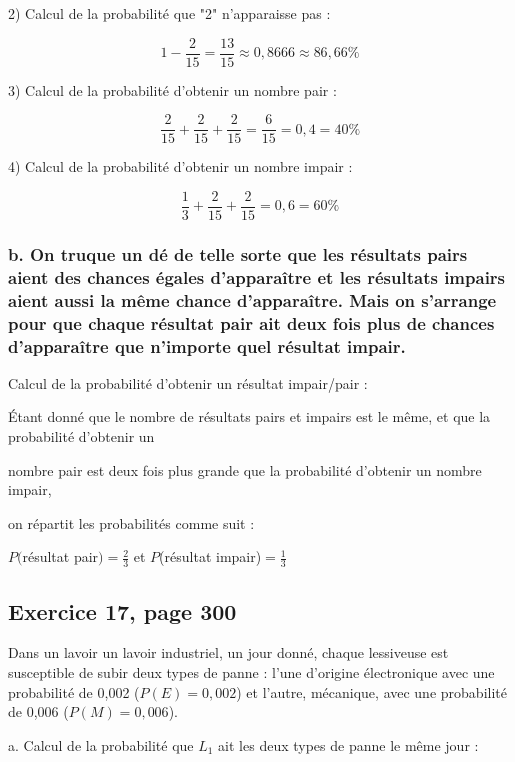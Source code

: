 \documentclass[10pt]{article}
\begin{document}
2) Calcul de la probabilité que "2" n'apparaisse pas :

$$1- \frac{2}{15} = \frac{13}{15}\approx 0,8666 \approx 86,66\%$$

3) Calcul de la probabilité d'obtenir un nombre pair :

$$\frac{2}{15}+\frac{2}{15}+\frac{2}{15}=\frac{6}{15}=0,4=40\%$$

\newpage

4) Calcul de la probabilité d'obtenir un nombre impair :

$$\frac{1}{3}+\frac{2}{15}+\frac{2}{15}=0,6=60\%$$

\subsubsection*{b. On truque un dé de telle sorte que les résultats pairs aient des chances égales d'apparaître et les résultats impairs aient aussi la même chance d'apparaître. Mais on s'arrange pour que chaque résultat pair ait deux fois plus de chances d'apparaître que n'importe quel résultat impair.}

Calcul de la probabilité d'obtenir un résultat impair/pair :\vspace{2pt}

\hspace{13pt}Étant donné que le nombre de résultats pairs et impairs est le même, et que la probabilité d'obtenir un 

\hspace{13pt}nombre pair est deux fois plus grande que la probabilité d'obtenir un nombre impair,

\hspace{13pt}on répartit les probabilités comme suit :

\begin{center}$P($résultat pair$\displaystyle )=\frac{2}{3}$ et $P$(résultat impair)$\displaystyle =\frac{1}{3}$\end{center}
\subsection*{Exercice 17, page 300}
Dans un lavoir un lavoir industriel, un jour donné, chaque lessiveuse est susceptible de subir deux types de panne : l'une d'origine électronique avec une probabilité de 0,002 ($P(E)=0,002$) et l'autre, mécanique, avec une probabilité de 0,006 ($P(M)=0,006$).\vspace{2pt}

a. Calcul de la probabilité que $L_1$ ait les deux types de panne le même jour :
\end{document}
